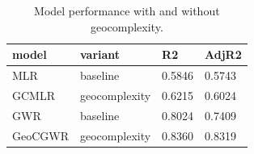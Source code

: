 \begin{table}[t]\centering
\caption{Model performance with and without geocomplexity.}\label{tab:improve}
\begin{tabular}{llll}
\hline
model & variant & R2 & AdjR2 \\
\hline
MLR & baseline & 0.5846 & 0.5743 \\
GCMLR & geocomplexity & 0.6215 & 0.6024 \\
GWR & baseline & 0.8024 & 0.7409 \\
GeoCGWR & geocomplexity & 0.8360 & 0.8319 \\
\hline
\end{tabular}\end{table}
